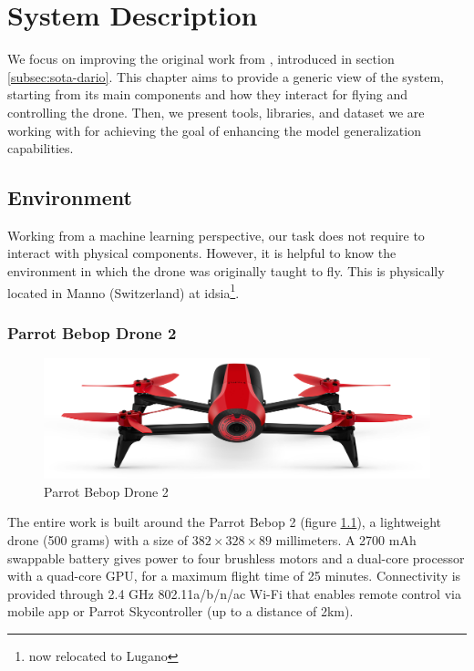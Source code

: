 \chapter{System Description}
\label{chap:system}


We focus on improving the original work from \cite{mantegazza2019visionbased}, introduced in section \ref{subsec:sota-dario}. This chapter aims to provide a generic view of the system, starting from its main components and how they interact for flying and controlling the drone. Then, we present tools, libraries, and dataset we are working with for achieving the goal of enhancing the model generalization capabilities.




\section{Environment}
\label{sec:hardware}

Working from a machine learning perspective, our task does not require to interact with physical components. However, it is helpful to know the environment in which the drone was originally taught to fly. This is physically located in Manno (Switzerland) at \gls{idsia}\footnote{now relocated to Lugano}.



\subsection{Parrot Bebop Drone 2}
\label{subsec:bebop}

\begin{figure}[!htb]
	\centering
	\includegraphics[width=.8\textwidth]{"contents/images/03-Parrot-Bebop-2"}
	\caption[Parrot Bebop Drone 2]{Parrot Bebop Drone 2}
	\label{fig:bebop}
\end{figure}

The entire work is built around the Parrot Bebop 2 \cite{bebop} (figure \ref{fig:bebop}), a lightweight drone (500 grams) with a size of $382 \times 328 \times 89$ millimeters. A 2700 mAh swappable battery gives power to four brushless motors and a dual-core processor with a quad-core GPU, for a maximum flight time of 25 minutes. Connectivity is provided through 2.4 GHz 802.11a/b/n/ac Wi-Fi that enables remote control via mobile app or Parrot Skycontroller (up to a distance of 2km).


